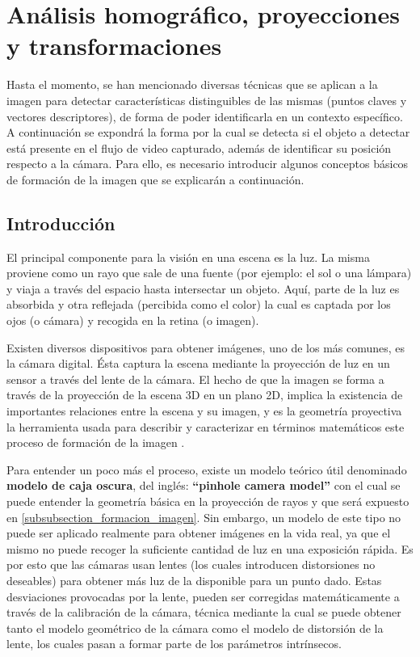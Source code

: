 \documentclass[a4paper,11pt,spanish]{article}
\begin{document}
\section{Análisis homográfico, proyecciones y transformaciones}
Hasta el momento, se han mencionado diversas técnicas que se aplican a la imagen para detectar características distinguibles de las mismas (puntos claves y vectores descriptores), de forma de poder identificarla en un contexto específico. A continuación se expondrá la forma por la cual se detecta si el objeto a detectar está presente en el flujo de video capturado, además de identificar su posición respecto a la cámara. Para ello, es necesario introducir algunos conceptos básicos de formación de la imagen que se explicarán a continuación.
\subsection{Introducción}
El principal componente para la visión en una escena es la luz. La misma proviene como un rayo que sale de una fuente (por ejemplo: el sol o una lámpara) y viaja a través del espacio hasta intersectar un objeto. Aquí, parte de la luz es absorbida y otra reflejada (percibida como el color) la cual es captada por los ojos (o cámara) y recogida en la retina (o imagen).

Existen diversos dispositivos para obtener imágenes, uno de los más comunes, es la cámara digital. Ésta captura la escena mediante la proyección de luz en un sensor a través del lente de la cámara. El hecho de que la imagen se forma a través de la proyección de la escena 3D en un plano 2D, implica la existencia de importantes relaciones entre la escena y su imagen, y es la geometría proyectiva la herramienta usada para describir y caracterizar en términos matemáticos este proceso de formación de la imagen \cite{citeulike:3484001, citeulike:9456628}.

Para entender un poco más el proceso, existe un modelo teórico útil denominado \textbf{modelo de caja oscura}, del inglés: \textbf{``pinhole camera model''} \cite{bb38231, citeulike:3484001} con el cual se puede entender la geometría básica en la proyección de rayos y que será expuesto en \ref{subsubsection_formacion_imagen}. Sin embargo, un modelo de este tipo no puede ser aplicado realmente para obtener imágenes en la vida real, ya que el mismo no puede recoger la suficiente cantidad de luz en una exposición rápida. Es por esto que las cámaras usan lentes (los cuales introducen distorsiones no deseables) para obtener más luz de la disponible para un punto dado.
Estas desviaciones provocadas por la lente, pueden ser corregidas matemáticamente a través de la calibración de la cámara, técnica mediante la cual se puede obtener tanto el modelo geométrico de la cámara como el modelo de distorsión de la lente, los cuales pasan a formar parte de los parámetros intrínsecos.
\end{document}
